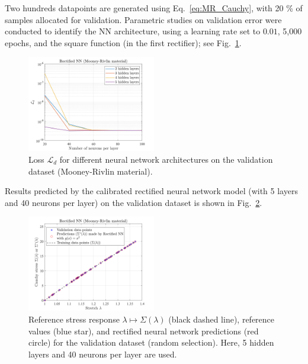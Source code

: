 Two hundreds datapoints are generated using Eq.~\eqref{eq:MR_Cauchy}, with 20 \% of samples allocated for validation.  Parametric studies on validation error were conducted to identify the NN architecture, using a learning rate set to $0.01$, 5,000 epochs, and the square function (in the first rectifier); see Fig.~\ref{fig:Mr_Err_Study}.
\begin{figure}[ht!]
    \begin{center}
        \includegraphics[width = 0.5\textwidth]{Pictures/Mr_Err.png}
    \end{center}
    \caption[Loss $\mathcal{L}_d$ for different neural network architectures.]{Loss $\mathcal{L}_d$ for different neural network architectures on the validation dataset (Mooney-Rivlin material).}
    \label{fig:Mr_Err_Study} 
\end{figure}
Results predicted by the calibrated rectified neural network model (with 5 layers and 40 neurons per layer) on the validation dataset is shown in Fig.~\ref{fig:MR best result 1}.
\begin{figure}[ht!]
    \begin{center}
\includegraphics[width=0.5\textwidth]{Pictures/sigma_MR.png}
    \end{center}
    \caption[Reference stress response and values, rectified NN predictions.]{Reference stress response $\lambda \mapsto \Sigma(\lambda)$ (black dashed line), reference values (blue star), and rectified neural network predictions (red circle) for the validation dataset (random selection). Here, 5 hidden layers and 40 neurons per layer are used.}
    \label{fig:MR best result 1}
\end{figure}

